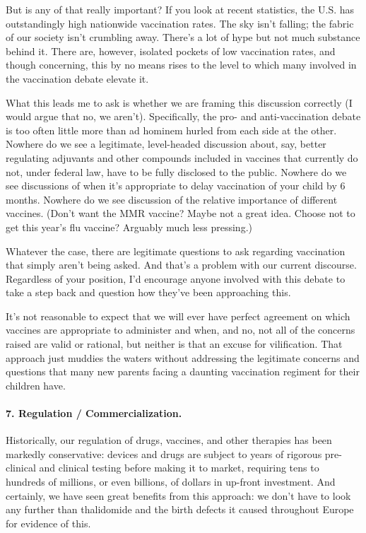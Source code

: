 \documentclass[11pt,letterpaper,final] {article}
\begin{document}
But is any of that really important? If you look at recent statistics, the U.S. has outstandingly high nationwide vaccination rates. The sky isn't falling; the fabric of our society isn't crumbling away. There's a lot of hype but not much substance behind it. There are, however, isolated pockets of low vaccination rates, and though concerning, this by no means rises to the level to which many involved in the vaccination debate elevate it.

What this leads me to ask is whether we are framing this discussion correctly (I would argue that no, we aren't). Specifically, the pro- and anti-vaccination debate is too often little more than ad hominem hurled from each side at the other. Nowhere do we see a legitimate, level-headed discussion about, say, better regulating adjuvants and other compounds included in vaccines that currently do not, under federal law, have to be fully disclosed to the public. Nowhere do we see discussions of when it's appropriate to delay vaccination of your child by 6 months. Nowhere do we see discussion of the relative importance of different vaccines. (Don't want the MMR vaccine? Maybe not a great idea. Choose not to get this year's flu vaccine? Arguably much less pressing.)

Whatever the case, there are legitimate questions to ask regarding vaccination that simply aren't being asked. And that's a problem with our current discourse. Regardless of your position, I'd encourage anyone involved with this debate to take a step back and question how they've been approaching this.

It's not reasonable to expect that we will ever have perfect agreement on which vaccines are appropriate to administer and when, and no, not all of the concerns raised are valid or rational, but neither is that an excuse for vilification. That approach just muddies the waters without addressing the legitimate concerns and questions that many new parents facing a daunting vaccination regiment for their children have.

\paragraph{7. Regulation / Commercialization.} Historically, our regulation of drugs, vaccines, and other therapies has been markedly conservative: devices and drugs are subject to years of rigorous pre-clinical and clinical testing before making it to market, requiring tens to hundreds of millions, or even billions, of dollars in up-front investment. And certainly, we have seen great benefits from this approach: we don't have to look any further than thalidomide and the birth defects it caused throughout Europe for evidence of this.
\end{document}
